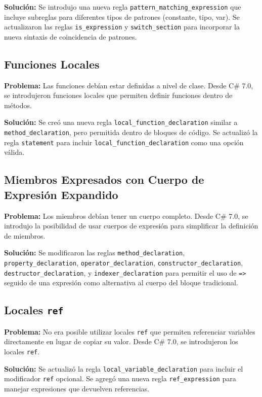 \textbf{Solución:} Se introdujo una nueva regla \texttt{pattern\_matching\_expression} que incluye subreglas para diferentes tipos de patrones (constante, tipo, var). Se actualizaron las reglas \texttt{is\_expression} y \texttt{switch\_section} para incorporar la nueva sintaxis de coincidencia de patrones.

\subsection*{Funciones Locales}
\textbf{Problema:} Las funciones debían estar definidas a nivel de clase. Desde C\# 7.0, se introdujeron funciones locales que permiten definir funciones dentro de métodos.

\textbf{Solución:} Se creó una nueva regla \texttt{local\_function\_declaration} similar a \texttt{method\_declaration}, pero permitida dentro de bloques de código. Se actualizó la regla \texttt{statement} para incluir \texttt{local\_function\_declaration} como una opción válida.

\subsection*{Miembros Expresados con Cuerpo de Expresión Expandido}
\textbf{Problema:} Los miembros debían tener un cuerpo completo. Desde C\# 7.0, se introdujo la posibilidad de usar cuerpos de expresión para simplificar la definición de miembros.

\textbf{Solución:} Se modificaron las reglas \texttt{method\_declaration}, \texttt{property\_declaration}, \texttt{operator\_declaration}, \texttt{constructor\_declaration}, \texttt{destructor\_declaration}, y \texttt{indexer\_declaration} para permitir el uso de \texttt{=>} seguido de una expresión como alternativa al cuerpo del bloque tradicional.

\subsection*{Locales \texttt{ref}}
\textbf{Problema:} No era posible utilizar locales \texttt{ref} que permiten referenciar variables directamente en lugar de copiar su valor. Desde C\# 7.0, se introdujeron los locales \texttt{ref}.

\textbf{Solución:} Se actualizó la regla \texttt{local\_variable\_declaration} para incluir el modificador \texttt{ref} opcional. Se agregó una nueva regla \texttt{ref\_expression} para manejar expresiones que devuelven referencias.

